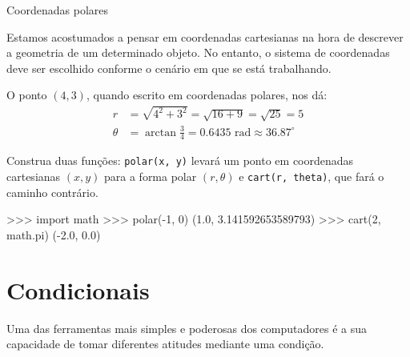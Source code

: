     \begin{problem}{Coordenadas polares}
        
        Estamos acostumados a pensar em coordenadas cartesianas na hora de descrever a geometria de um determinado objeto. No entanto, o sistema de coordenadas deve ser escolhido conforme o cenário em que se está trabalhando.
		

        O ponto $(4, 3)$, quando escrito em coordenadas polares, nos dá:
        \begin{align*}
        r &= \sqrt{4^2 + 3^2} = \sqrt{16 + 9} = \sqrt{25} = 5\\
        \theta &= \arctan\frac{3}{4} = 0.6435 \text{ rad} \approx 36.87^{\circ}
        \end{align*}
        
        \proposal
		Construa duas funções: \texttt{polar(x, y)} levará um ponto em coordenadas cartesianas $(x, y)$ para a forma polar $(r, \theta)$ e \texttt{cart(r, theta)}, que fará o caminho contrário.\par
        
        \begin{lstpython}
    >>> import math
    >>> polar(-1, 0)
    (1.0, 3.141592653589793)
    >>> cart(2, math.pi)
    (-2.0, 0.0)
        \end{lstpython}
        
    \end{problem}

	\section*{Condicionais}%
	Uma das ferramentas mais simples e poderosas dos computadores é a sua capacidade de tomar diferentes atitudes mediante uma condição. 

